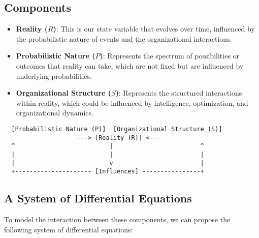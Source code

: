 \documentclass{article}
\begin{document}
\subsection*{Components}
\begin{itemize}
  \item \textbf{Reality (\(R\))}: This is our state variable that evolves over time, influenced by the probabilistic nature of events and the organizational interactions.
  \item \textbf{Probabilistic Nature (\(P\))}: Represents the spectrum of possibilities or outcomes that reality can take, which are not fixed but are influenced by underlying probabilities.
  \item \textbf{Organizational Structure (\(S\))}: Represents the structured interactions within reality, which could be influenced by intelligence, optimization, and organizational dynamics.
\end{itemize}
\begin{verbatim}
  [Probabilistic Nature (P)]  [Organizational Structure (S)]
                    ---> [Reality (R)] <---
  ^                          |                        ^
  |                          |                        |
  |                          v                        |
  +--------------------- [Influences] ----------------+
\end{verbatim}
\subsection*{A System of Differential Equations}

To model the interaction between these components, we can propose the following system of differential equations:
\end{document}
